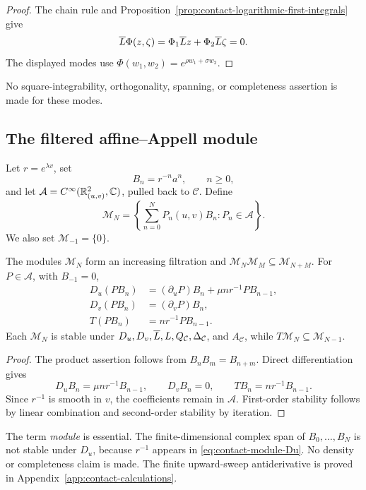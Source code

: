 \begin{proof}
The chain rule and Proposition~\ref{prop:contact-logarithmic-first-integrals} give
\[
 \overline L\Phi(z,\zeta)
 =\Phi_1\overline L z+\Phi_2\overline L\zeta=0.
\]
The displayed modes use $\Phi(w_1,w_2)=e^{\rho w_1+\sigma w_2}$.
\end{proof}

No square-integrability, orthogonality, spanning, or completeness assertion is made
for these modes.

\subsection{The filtered affine--Appell module}

Let $r=e^{\lambda v}$, set
\begin{equation}\label{eq:contact-appell-generators}
 B_n=r^{-n}a^n,\qquad n\ge0,
\end{equation}
and let $\mathcal A=C^\infty(\mathbb{R}^2_{(u,v)},\mathbb{C})$, pulled back to
$\mathcal C$.  Define
\begin{equation}\label{eq:contact-filtered-modules}
 \mathcal M_N
 =\left\{\sum_{n=0}^NP_n(u,v)B_n:P_n\in\mathcal A\right\}.
\end{equation}
We also set $\mathcal M_{-1}=\{0\}$.

\begin{proposition}
\label{prop:contact-filtered-appell-module}
The modules $\mathcal M_N$ form an increasing filtration and
$\mathcal M_N\mathcal M_M\subseteq\mathcal M_{N+M}$.  For
$P\in\mathcal A$, with $B_{-1}=0$,
\begin{align}
 D_u(PB_n)
  &=(\partial_uP)B_n+\mu nr^{-1}PB_{n-1},\label{eq:contact-module-Du}\\
 D_v(PB_n)
  &=(\partial_vP)B_n,\label{eq:contact-module-Dv}\\
 T(PB_n)&=nr^{-1}PB_{n-1}.\label{eq:contact-module-T}
\end{align}
Each $\mathcal M_N$ is stable under
$D_u,D_v,\overline L,L,Q_{\mathcal C},\Delta_{\mathcal C}$, and
$A_{\mathcal C}$, while $T\mathcal M_N\subseteq\mathcal M_{N-1}$.
\end{proposition}

\begin{proof}
The product assertion follows from $B_nB_m=B_{n+m}$.  Direct differentiation
gives
\[
 D_uB_n=\mu nr^{-1}B_{n-1},\qquad D_vB_n=0,\qquad
 TB_n=nr^{-1}B_{n-1}.
\]
Since $r^{-1}$ is smooth in $v$, the coefficients remain in $\mathcal A$.
First-order stability follows by linear combination and second-order stability by
iteration.
\end{proof}

\begin{remark}
The term \emph{module} is essential.  The finite-dimensional complex span of
$B_0,\ldots,B_N$ is not stable under $D_u$, because $r^{-1}$ appears in
\eqref{eq:contact-module-Du}.  No density or completeness claim is made.  The
finite upward-sweep antiderivative is proved in
Appendix~\ref{app:contact-calculations}.
\end{remark}

